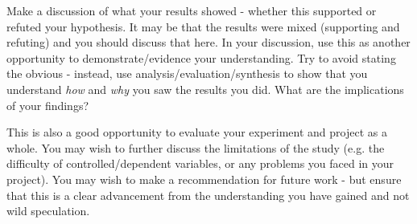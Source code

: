 \documentclass[conference]{IEEEtran}
\begin{document}
Make a discussion of what your results showed - whether this supported or refuted your hypothesis.  It may be that the results were mixed (supporting and refuting) and you should discuss that here. In your discussion, use this as another opportunity to demonstrate/evidence your understanding. Try to avoid stating the obvious - instead, use analysis/evaluation/synthesis to show that you understand \emph{how} and \emph{why} you saw the results you did.  What are the implications of your findings?  

This is also a good opportunity to evaluate your experiment and project as a whole.  You may wish to further discuss the limitations of the study (e.g. the difficulty of controlled/dependent variables, or any problems you faced in your project).  You may wish to make a recommendation for future work - but ensure that this is a clear advancement from the understanding you have gained and not wild speculation.


 

\end{document}
